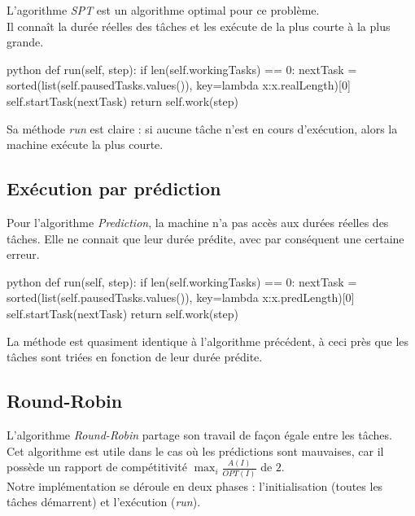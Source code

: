 \documentclass[12pt]{article}
\begin{document}
L'agorithme \emph{SPT} est un algorithme optimal pour ce problème. \\

Il connaît la durée réelles des tâches et les exécute de la plus courte à la plus grande. \\ 

\begin{mintedbox}{python}
    def run(self, step):
        if len(self.workingTasks) == 0:
            nextTask = sorted(list(self.pausedTasks.values()), key=lambda x:x.realLength)[0]
            self.startTask(nextTask)
        return self.work(step)
\end{mintedbox}

Sa méthode \emph{run} est claire : si aucune tâche n'est en cours d'exécution, alors la machine exécute la plus courte.

\subsection{Exécution par prédiction}

Pour l'algorithme \emph{Prediction}, la machine n'a pas accès aux durées réelles des tâches. Elle ne connait que leur durée prédite, avec par conséquent une certaine erreur. \\

\begin{mintedbox}{python}
    def run(self, step):
        if len(self.workingTasks) == 0:
            nextTask = sorted(list(self.pausedTasks.values()), key=lambda x:x.predLength)[0]
            self.startTask(nextTask)
        return self.work(step)
\end{mintedbox}

La méthode est quasiment identique à l'algorithme précédent, à ceci près que les tâches sont triées en fonction de leur durée prédite.

\subsection{Round-Robin}

L'algorithme \emph{Round-Robin} partage son travail de façon égale entre les tâches. \\

Cet algorithme est utile dans le cas où les prédictions sont mauvaises, car il possède un rapport de compétitivité $\max_i {\frac {A(I)} {OPT(I)}}$ de $2$. \\

Notre implémentation se déroule en deux phases : l'initialisation (toutes les tâches démarrent) et l'exécution (\emph{run}). \\
\end{document}
